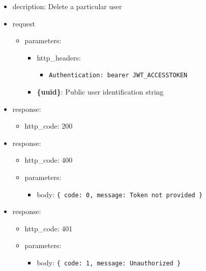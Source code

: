 \documentclass[
]{article}
\begin{document}
\begin{itemize}
\item
  decription: Delete a particular user
\item
  request

  \begin{itemize}
  \item
    parameters:

    \begin{itemize}
    \item
      http\_headers:

      \begin{itemize}
      \item
        \texttt{Authentication:\ \textquotesingle{}bearer\ JWT\_ACCESSTOKEN\textquotesingle{}}
      \end{itemize}
    \item
      \textbf{\{uuid\}}: Public user identification string
    \end{itemize}
  \end{itemize}
\item
  response:

  \begin{itemize}
  \item
    http\_code: 200
  \end{itemize}
\item
  response:

  \begin{itemize}
  \item
    http\_code: 400
  \item
    parameters:

    \begin{itemize}
    \item
      body: \texttt{\{
      \textquotesingle{}code\textquotesingle{}:\ 0,\ 
      \textquotesingle{}message\textquotesingle{}:\ \textquotesingle{}Token\ not\ provided\textquotesingle{}
      \}}
    \end{itemize}
  \end{itemize}
\item
  response:

  \begin{itemize}
  \item
    http\_code: 401
  \item
    parameters:

    \begin{itemize}
    \item
      body: \texttt{\{
      \textquotesingle{}code\textquotesingle{}:\ 1,\ 
      \textquotesingle{}message\textquotesingle{}:\ \textquotesingle{}Unauthorized\textquotesingle{}
      \}}
    \end{itemize}
  \end{itemize}
\end{itemize}
\end{document}
